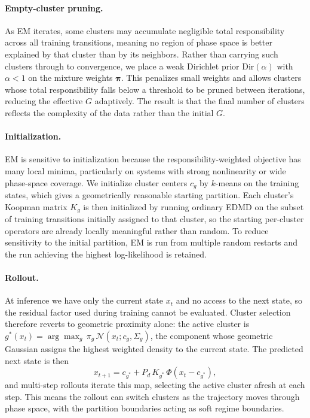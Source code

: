 \documentclass{article}
\begin{document}
\paragraph{Empty-cluster pruning.} As EM iterates, some clusters may accumulate negligible total responsibility across all training transitions, meaning no region of phase space is better explained by that cluster than by its neighbors. Rather than carrying such clusters through to convergence, we place a weak Dirichlet prior $\mathrm{Dir}(\alpha)$ with $\alpha < 1$ on the mixture weights $\boldsymbol{\pi}$. This penalizes small weights and allows clusters whose total responsibility falls below a threshold to be pruned between iterations, reducing the effective $G$ adaptively. The result is that the final number of clusters reflects the complexity of the data rather than the initial $G$.

\paragraph{Initialization.} EM is sensitive to initialization because the responsibility-weighted objective has many local minima, particularly on systems with strong nonlinearity or wide phase-space coverage. We initialize cluster centers $c_g$ by $k$-means on the training states, which gives a geometrically reasonable starting partition. Each cluster's Koopman matrix $K_g$ is then initialized by running ordinary EDMD on the subset of training transitions initially assigned to that cluster, so the starting per-cluster operators are already locally meaningful rather than random. To reduce sensitivity to the initial partition, EM is run from multiple random restarts and the run achieving the highest log-likelihood is retained.

\paragraph{Rollout.} At inference we have only the current state $x_t$ and no access to the next state, so the residual factor used during training cannot be evaluated. Cluster selection therefore reverts to geometric proximity alone: the active cluster is $g^*(x_t) = \arg\max_g\, \pi_g\, \mathcal{N}(x_t; c_g, \Sigma_g)$, the component whose geometric Gaussian assigns the highest weighted density to the current state. The predicted next state is then
\[
x_{t+1} = c_{g^*} + P_d\, K_{g^*}\, \Phi(x_t - c_{g^*}),
\]
and multi-step rollouts iterate this map, selecting the active cluster afresh at each step. This means the rollout can switch clusters as the trajectory moves through phase space, with the partition boundaries acting as soft regime boundaries.
\end{document}
